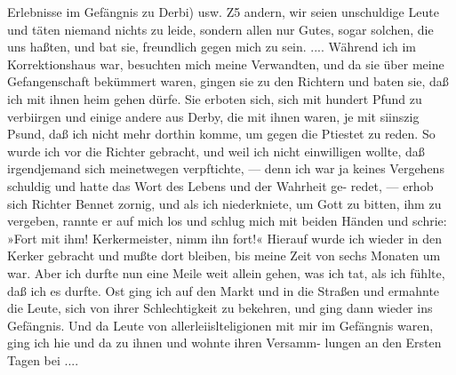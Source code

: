 Erlebnisse im Gefängnis zu Derbi) usw. Z5
andern, wir seien unschuldige Leute und täten niemand nichts zu
leide, sondern allen nur Gutes, sogar solchen, die uns haßten,
und bat sie, freundlich gegen mich zu sein. ....
Während ich im Korrektionshaus war, besuchten mich meine
Verwandten, und da sie über meine Gefangenschaft bekümmert
waren, gingen sie zu den Richtern und baten sie, daß ich mit
ihnen heim gehen dürfe. Sie erboten sich, sich mit hundert Pfund
zu verbiirgen und einige andere aus Derby, die mit ihnen waren,
je mit siinszig Psund, daß ich nicht mehr dorthin komme, um
gegen die Ptiestet zu reden. So wurde ich vor die Richter
gebracht, und weil ich nicht einwilligen wollte, daß irgendjemand
sich meinetwegen verpftichte, — denn ich war ja keines Vergehens
schuldig und hatte das Wort des Lebens und der Wahrheit ge-
redet, — erhob sich Richter Bennet zornig, und als ich niederkniete, um
Gott zu bitten, ihm zu vergeben, rannte er auf mich los und schlug
mich mit beiden Händen und schrie: »Fort mit ihm! Kerkermeister,
nimm ihn fort!« Hierauf wurde ich wieder in den Kerker gebracht
und mußte dort bleiben, bis meine Zeit von sechs Monaten um
war. Aber ich durfte nun eine Meile weit allein gehen, was ich
tat, als ich fühlte, daß ich es durfte. Ost ging ich auf den Markt
und in die Straßen und ermahnte die Leute, sich von ihrer
Schlechtigkeit zu bekehren, und ging dann wieder ins Gefängnis.
Und da Leute von allerleiislteligionen mit mir im Gefängnis
waren, ging ich hie und da zu ihnen und wohnte ihren Versamm-
lungen an den Ersten Tagen bei ....